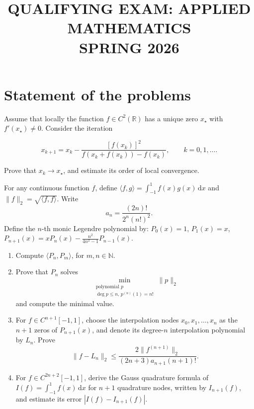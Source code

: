 \documentclass[11pt,a4paper]{article}
\title{\textbf{QUALIFYING EXAM: APPLIED MATHEMATICS}\\[0.5em]\Large SPRING 2026}
\date{}
\author{}
\newcommand{\examstatement}[1]{%
  \par\addvspace{0.85em}%
  \noindent{\bfseries #1}\par\nobreak\addvspace{0.28em}%
}
\begin{document}
\maketitle
\vspace{-3em}

\tableofcontents

\section{Statement of the problems}

\examstatement{Problem 1. [10 points]}
Assume that locally the function \(f \in C^{2}(\mathbb{R})\) has a unique zero \(x_{\star}\) with \(f'(x_{\star}) \neq 0\). Consider the iteration

\[
x_{k+1} = x_{k} - \frac{[f(x_{k})]^{2}}{f(x_{k} + f(x_{k})) - f(x_{k})},\qquad k = 0, 1, \dots.
\]

Prove that \(x_{k} \to x_{\star}\), and estimate its order of local convergence.

\examstatement{Problem 2. [20 points]}
For any continuous function \(f\), define \(\langle f, g \rangle = \int_{-1}^{1} f(x)g(x)\,\mathrm{d}x\) and \(\|f\|_2 = \sqrt{\langle f, f \rangle}\). Write
\[
a_{n}=\frac{(2n)!}{2^{n}(n!)^{2}}.
\]
Define the \(n\)-th monic Legendre polynomial by: \(P_{0}(x)=1\), \(P_{1}(x)=x\), \(P_{n+1}(x)=xP_{n}(x)-\frac{n^{2}}{4n^{2}-1}P_{n-1}(x)\).
\begin{enumerate}[label=(\alph*)]
    \item Compute \(\langle P_{n}, P_{m} \rangle\), for \(m,n\in\mathbb{N}\).
    \item Prove that \(P_{n}\) solves
    \[
    \min_{\substack{\text{polynomial }p\\ \deg p\le n,\, p^{(n)}(1)=n!}}\|p\|_{2}
    \]
    and compute the minimal value.
    \item For \(f\in C^{n+1}[-1,1]\), choose the interpolation nodes \(x_{0},x_{1},\ldots,x_{n}\) as the \(n+1\) zeros of \(P_{n+1}(x)\), and denote its degree-\(n\) interpolation polynomial by \(L_{n}\). Prove
    \[
    \|f-L_{n}\|_{2}\le\frac{2\|f^{(n+1)}\|_{2}}{(2n+3)a_{n+1}(n+1)!}.
    \]
    \item For \(f\in C^{2n+2}[-1,1]\), derive the Gauss quadrature formula of \(I(f)=\int_{-1}^{1}f(x)\,\mathrm{d}x\) for \(n+1\) quadrature nodes, written by \(I_{n+1}(f)\), and estimate its error \(|I(f)-I_{n+1}(f)|\).
\end{enumerate}
\end{document}
